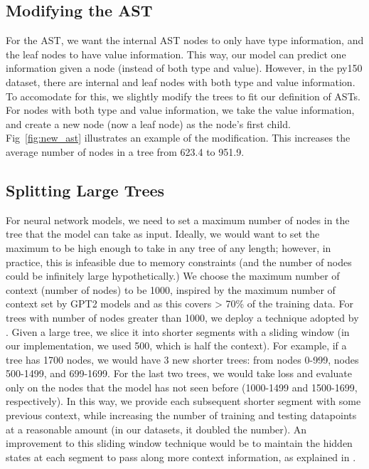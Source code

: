 \documentclass[nonacm, sigconf]{acmart}
\begin{document}
\subsection{Modifying the AST}
\label{sec:modifyast}
For the AST, we want the internal AST nodes to only have type information, and the leaf nodes to have value information. This way, our model can predict one information given a node (instead of both type and value). However, in the py150 dataset, there are internal and leaf nodes with both type and value information. To accomodate for this, we slightly modify the trees to fit our definition of ASTs. For nodes with both type and value information, we take the value information, and create a new node (now a leaf node) as the node's first child. Fig~\ref{fig:new_ast} illustrates an example of the modification. This increases the average number of nodes in a tree from 623.4 to 951.9.

\subsection{Splitting Large Trees}
\label{sec:splittrees}
For neural network models, we need to set a maximum number of nodes in the tree that the model can take as input. Ideally, we would want to set the maximum to be high enough to take in any tree of any length; however, in practice, this is infeasible due to memory constraints (and the number of nodes could be infinitely large hypothetically.) We choose the maximum number of context (number of nodes) to be 1000, inspired by the maximum number of context set by GPT2 models and as this covers > 70\% of the training data. For trees with number of nodes greater than 1000, we deploy a technique adopted by \cite{alrfou2018characterlevel}. Given a large tree, we slice it into shorter segments with a sliding window (in our implementation, we used 500, which is half the context). For example, if a tree has 1700 nodes, we would have 3 new shorter trees: from nodes 0-999, nodes 500-1499, and 699-1699. For the last two trees, we would take loss and evaluate only on the nodes that the model has not seen before (1000-1499 and 1500-1699, respectively). In this way, we provide each subsequent shorter segment with some previous context, while increasing the number of training and testing datapoints at a reasonable amount (in our datasets, it doubled the number). An improvement to this sliding window technique would be to maintain the hidden states at each segment to pass along more context information, as explained in \cite{dai2019transformerxl}. 
\end{document}
